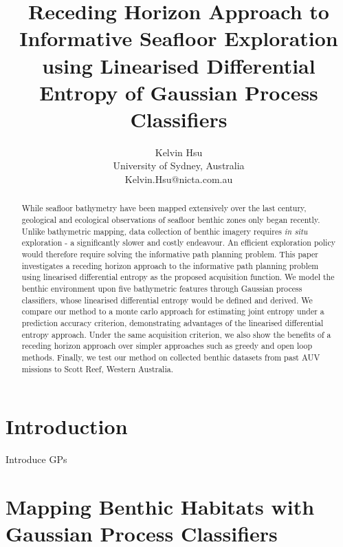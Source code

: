 \documentclass{article}
\title{Receding Horizon Approach to Informative Seafloor Exploration using Linearised Differential Entropy of Gaussian Process Classifiers}
\author{Kelvin Hsu \\ University of Sydney, Australia \\ 
Kelvin.Hsu@nicta.com.au}
\begin{document}
\maketitle

\begin{abstract}
	While seafloor bathymetry have been mapped extensively over the last century, geological and ecological observations of seafloor benthic zones only began recently. Unlike bathymetric mapping, data collection of benthic imagery requires \textit{in situ} exploration - a significantly slower and costly endeavour. An efficient exploration policy would therefore require solving the informative path planning problem. This paper investigates a receding horizon approach to the informative path planning problem using linearised differential entropy as the proposed acquisition function. We model the benthic environment upon five bathymetric features through Gaussian process classifiers, whose linearised differential entropy would be defined and derived. We compare our method to a monte carlo approach for estimating joint entropy under a prediction accuracy criterion, demonstrating advantages of the linearised differential entropy approach. Under the same acquisition criterion, we also show the benefits of a receding horizon approach over simpler approaches such as greedy and open loop methods. Finally, we test our method on collected benthic datasets from past AUV missions to Scott Reef, Western Australia. 
\end{abstract}

\section{Introduction}
\label{Section:Introduction}
	
	Introduce GPs \cite{GaussianProcessForMachineLearning}
%	
\section{Mapping Benthic Habitats with Gaussian Process Classifiers}
\label{Section:BenthicMapping}
\end{document}

